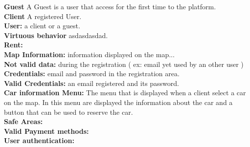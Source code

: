 \textbf{Guest}
A Guest is a user that access for the first time to the platform.\\
\textbf{Client}
A registered User.\\
\textbf{User:}
a client or a guest.\\
\textbf{Virtuous  behavior}
asdasdasdad.\\
\textbf{Rent:}
\\
\textbf{Map Information:}
information displayed on the map...\\
\textbf{Not valid data:}
during the registration ( ex: email yet used by an other user )\\
\textbf{Credentials:}
email and password in the registration area.\\
\textbf{Valid Credentials:}
an email registered and its password.\\
\textbf{Car information Menu:}
The menu that is displayed when a client select a car on the map. In this menu are displayed the information about the car and a button that can be used to reserve the car.\\
\textbf{Safe Areas:} 
\\
\textbf{Valid Payment methods:} 
\\
\textbf{User authentication:}
\\
